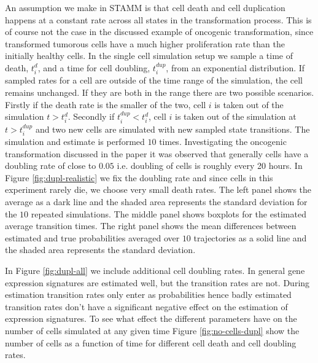 An assumption we make in STAMM is that cell death and cell duplication happens at a constant rate across all states in the transformation process. This is of course not the case in the discussed example of oncogenic transformation, since transformed tumorous cells have a much higher proliferation rate than the initially healthy cells. In the single cell simulation setup we sample a time of death, $t_i^{d}$, and a time for cell doubling, $t_i^{dup}$, from an exponential distribution. If sampled rates for a cell are outside of the time range of the simulation, the cell remains unchanged. If they are both in the range there are two possible scenarios. Firstly if the death rate is the smaller of the two, cell $i$ is taken out of the simulation $t>t_i^d$. Secondly if $t_i^{dup}<t_i^d$, cell $i$ is taken out of the simulation at $t > t_i^{dup}$ and two new cells are simulated with new sampled state transitions. The simulation and estimate is performed $10$ times. Investigating the oncogenic transformation discussed in the paper it was observed that generally cells have a doubling rate of close to $0.05$ i.e. doubling of cells is roughly every 20 hours. In Figure \ref{fig:dupl-realistic} we fix the doubling rate and since cells in this experiment rarely die, we choose very small death rates. The left panel shows the average as a dark line and the shaded area represents the standard deviation for the $10$ repeated simulations. The middle panel shows boxplots for the estimated average transition times. The right panel shows the mean differences between estimated and true probabilities averaged over $10$ trajectories as a solid line and the shaded area represents the standard deviation.

In Figure \ref{fig:dupl-all} we include additional cell doubling rates. In general gene expression signatures are estimated well, but the transition rates are not. During estimation transition rates only enter as probabilities hence badly estimated transition rates don't have a significant negative effect on the estimation of expression signatures. To see what effect the different parameters have on the number of cells simulated at any given time Figure \ref{fig:no-cells-dupl} show the number of cells as a function of time for different cell death and cell doubling rates.

